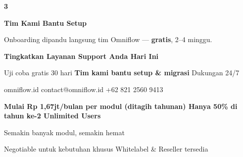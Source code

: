 \documentclass[a4paper]{article}
\begin{document}
\begin{center}
\begin{minipage}[t]{0.318\textwidth}
{\begin{minipage}[t][4.7cm][c]{\dimexpr\linewidth-2\fboxsep\relax}
            \begin{center}{\fontsize{22}{26}\selectfont\bfseries\color{BluePrimary} 3}\end{center}
            \vspace{2pt}
            \begin{center}
                {\fontsize{10}{13}\selectfont\bfseries\color{BlueDark} Tim Kami Bantu Setup}\par\vspace{3pt}
                {\fontsize{9}{12}\selectfont\color{TextDark} Onboarding dipandu langsung tim Omniflow --- \textbf{gratis}, 2--4 minggu.}
            \end{center}
        \end{minipage}}
\end{minipage}
\end{center}

\vspace{8pt}

{\setlength{\fboxsep}{10pt}\setlength{\fboxrule}{0pt}%
\noindent\colorbox{BluePrimary}{%
    \begin{minipage}{\dimexpr\textwidth-2\fboxsep\relax}
        \centering
        {\fontsize{13}{16}\selectfont\bfseries\color{White} Tingkatkan Layanan Support Anda Hari Ini}\par\vspace{3pt}
        {\fontsize{9.5}{12}\selectfont\color{BlueMid} Uji coba gratis 30 hari \enspace\textbullet\enspace \textbf{Tim kami bantu setup \& migrasi} \enspace\textbullet\enspace Dukungan 24/7}\par\vspace{2pt}
        {\fontsize{9.5}{12}\selectfont\color{BlueLight} omniflow.id \enspace\textbullet\enspace contact@omniflow.id \enspace\textbullet\enspace +62 821 2560 9413}
    \end{minipage}}}


\vspace{6pt}

{\setlength{\fboxsep}{8pt}\setlength{\fboxrule}{0pt}%
\noindent\colorbox{BlueBg}{%
    \begin{minipage}{\dimexpr\textwidth-2\fboxsep\relax}
        \centering
        {\fontsize{9}{12}\selectfont\bfseries\color{BluePrimary}
        Mulai Rp 1,67jt/bulan per modul (ditagih tahunan) \enspace\textbullet\enspace Hanya 50\% di tahun ke-2 \enspace\textbullet\enspace Unlimited Users}\par\vspace{1pt}
        {\fontsize{8.5}{11}\selectfont\color{BlueDark}
        Semakin banyak modul, semakin hemat}\par\vspace{1pt}
        {\fontsize{8}{10}\selectfont\color{TextLight}
        Negotiable untuk kebutuhan khusus \enspace\textbullet\enspace Whitelabel \& Reseller tersedia}
    \end{minipage}}}

\restoregeometry
\pagestyle{empty}
\end{document}
